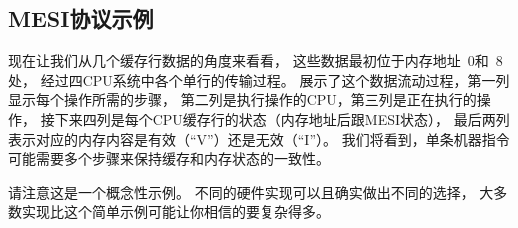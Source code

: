 \QuickQuizEnd

\subsection{MESI协议示例}
\label{sec:app:whymb:MESI Protocol Example}

现在让我们从几个缓存行数据的角度来看看，
这些数据最初位于内存地址~0和~8处，
经过四CPU系统中各个单行的传输过程。
展示了这个数据流动过程，第一列显示每个操作所需的步骤，
第二列是执行操作的CPU，第三列是正在执行的操作，
接下来四列是每个CPU缓存行的状态（内存地址后跟MESI状态），
最后两列表示对应的内存内容是有效（``V''）还是无效（``I''）\@。
我们将看到，单条机器指令可能需要多个步骤来保持缓存和内存状态的一致性。

请注意这是一个概念性示例。
不同的硬件实现可以且确实做出不同的选择，
大多数实现比这个简单示例可能让你相信的要复杂得多。


